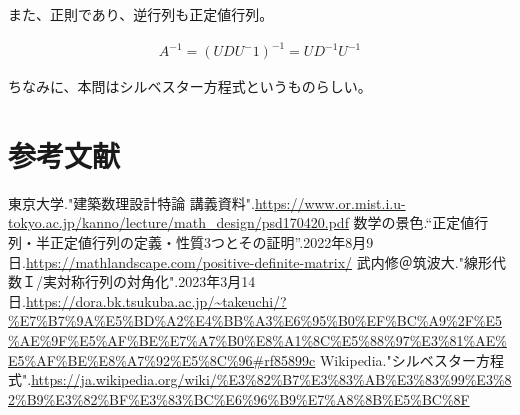 \documentclass[a4paper, 10pt, dvipdfmx]{jlreq}
\begin{document}
また、正則であり、逆行列も正定値行列。

\begin{align*}
  A^{-1}=(UDU^-1)^{-1}=UD^{-1}U^{-1}
\end{align*}

ちなみに、本問はシルベスター方程式というものらしい。

\section{参考文献}
\begin{thebibliography}{9}
  東京大学."建築数理設計特論 講義資料".\url{https://www.or.mist.i.u-tokyo.ac.jp/kanno/lecture/math_design/psd170420.pdf}
  数学の景色.“正定値行列・半正定値行列の定義・性質3つとその証明”.2022年8月9日.\url{https://mathlandscape.com/positive-definite-matrix/}
  武内修＠筑波大."線形代数Ｉ/実対称行列の対角化".2023年3月14日.\url{https://dora.bk.tsukuba.ac.jp/~takeuchi/?%E7%B7%9A%E5%BD%A2%E4%BB%A3%E6%95%B0%EF%BC%A9%2F%E5%AE%9F%E5%AF%BE%E7%A7%B0%E8%A1%8C%E5%88%97%E3%81%AE%E5%AF%BE%E8%A7%92%E5%8C%96#rf85899c}
  Wikipedia."シルベスター方程式".\url{https://ja.wikipedia.org/wiki/%E3%82%B7%E3%83%AB%E3%83%99%E3%82%B9%E3%82%BF%E3%83%BC%E6%96%B9%E7%A8%8B%E5%BC%8F}
\end{thebibliography}
\end{document}
